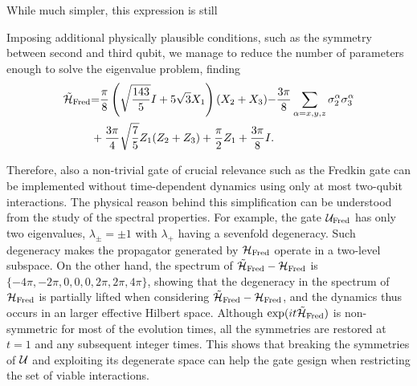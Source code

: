 While much simpler, this expression is still 

Imposing additional physically plausible conditions, such as the symmetry between second and third qubit, we manage to reduce the number of parameters enough to solve the eigenvalue problem, finding %
\begin{align}
    \tilde{\mathcal{H}}_{\operatorname{Fred}} &{=} 
    \frac{\pi}{8} \left( \sqrt{\frac{143}{5}}I+5\sqrt 3 X_1\right)(X_2 + X_3) {-}\frac{3\pi}{8} \sum_{\alpha=x,y,z}\sigma^\alpha_2 \sigma^\alpha_3
    \nonumber\\
    &+
    \frac{3\pi}{4}\sqrt{\frac{7}{5}}Z_1(Z_2+Z_3) +\frac{\pi}{2}Z_1+\frac{3\pi}{8}I.
    \label{eq:fredkin_generator}
\end{align}

Therefore, also a non-trivial gate of crucial relevance such as the Fredkin gate can be implemented without time-dependent dynamics using only at most two-qubit interactions.
The physical reason behind this simplification can be understood from the study of the spectral properties.
For example, the gate $\mathcal{U}_{\operatorname{Fred}}$ has only two eigenvalues, $\lambda_\pm=\pm1$
with $\lambda_+$ having a sevenfold degeneracy. Such degeneracy makes the propagator generated by $\mathcal{H}_{\operatorname{Fred}}$ operate in a two-level subspace.
On the other hand, the spectrum of $\tilde{\mathcal{H}}_{\operatorname{Fred}}-\mathcal{H}_{\operatorname{Fred}}$ is $\{{-}4\pi,{-}2\pi,0,0,0,2\pi,2\pi,4\pi\}$, showing that the degeneracy in the spectrum of $\mathcal{H}_{\operatorname{Fred}}$ is partially lifted when considering 
$\tilde{\mathcal{H}}_{\operatorname{Fred}}-\mathcal{H}_{\operatorname{Fred}}$, and the dynamics thus occurs in an  larger effective Hilbert space.  %
Although $\exponential(it\HTildeFred)$ is non-symmetric for most of the evolution times, all the symmetries are restored at $t=1$ and any subsequent integer times. This  shows that breaking the symmetries of $\mathcal{U}$ and exploiting its degenerate space can help the gate gesign when restricting the set of viable interactions.

